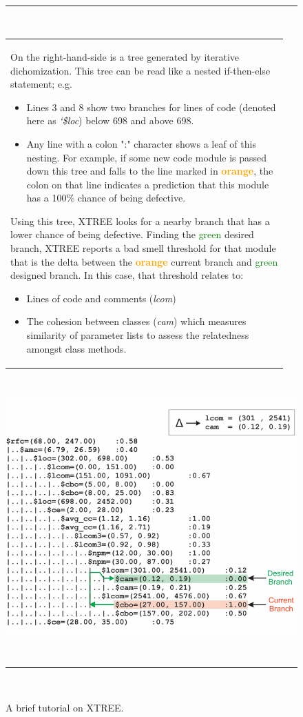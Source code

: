 \documentclass[twocolumn,5p]{elsarticle}
\theoremstyle{break}
\begin{document}
\begin{figure}[!t]
~\hrule~
\begin{minipage}{.53\linewidth}
\small
 \begin{tabular}{p{0.95\linewidth}} 
 On the right-hand-side is a tree
 generated by iterative dichomization. 
 This tree can be read like a nested if-then-else statement; e.g.
 \begin{itemize}
     \item Lines 3 and 8 show two branches for lines of code (denoted here as {\em `\$loc}) below 698 and above 698.
     \item Any line with a colon ":" character shows  a  leaf  of  this  nesting.   For  example,  if  some  new  code module is passed down this tree and falls to the line marked in \textcolor{orange}{{\bf orange}},  the colon on that line indicates a prediction that this module has a 100\% chance of being defective. 
     \end{itemize}
Using this tree,
 XTREE looks for a nearby branch that has a lower chance of being defective. Finding the \textcolor{green}{{ green}} desired  branch,  XTREE reports a bad smell threshold for that module that is the delta between the \textcolor{orange}{{\bf orange}}  current branch  and   \textcolor{green}{{ green}} designed branch. 
 In this case, that threshold relates to:
 \begin{itemize}
     \item Lines of code and comments ({\em lcom}) 
     \item The cohesion between classes ({\em cam}) which measures similarity of parameter lists to assess the relatedness amongst class   methods.
     \end{itemize}\\ 
 \end{tabular}
 \end{minipage}~~~~
 \begin{minipage}{.45\linewidth}
\includegraphics[width=\linewidth]{figs/XTREE_samp.png}
\end{minipage}
~\hrule~
 \caption{A brief tutorial on XTREE.} \label{fig:xtree_samp}
\end{figure}
\end{document}
